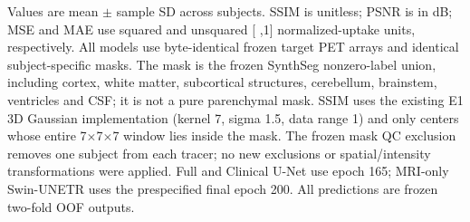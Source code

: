 \documentclass{article}
\providecommand{\DIFaddtex}[1]{{\protect\color{blue} \sf #1}} %
\providecommand{\DIFaddFL}[1]{\DIFadd{#1}} %
\providecommand{\DIFadd}[1]{\texorpdfstring{\DIFaddtex{#1}}{#1}} %
\begin{document}
\begin{table}[t]
\centering
\caption{{\color{blue}Mask-restricted quality of frozen two-fold OOF PET predictions.}}
\label{tab:r3_11_masked_summary}
\par\smallskip
\begin{minipage}{\textwidth}\footnotesize
\DIFaddFL{Values are mean $\pm$ sample SD across subjects. SSIM is unitless; PSNR is in dB; MSE and MAE use squared and unsquared }[\DIFaddFL{0,1}] \DIFaddFL{normalized-uptake units, respectively. All models use byte-identical frozen target PET arrays and identical subject-specific masks. The mask is the frozen SynthSeg nonzero-label union, including cortex, white matter, subcortical structures, cerebellum, brainstem, ventricles and CSF; it is not a pure parenchymal mask. SSIM uses the existing E1 3D Gaussian implementation (kernel 7, sigma 1.5, data range 1) and only centers whose entire 7$\times$7$\times$7 window lies inside the mask. The frozen mask QC exclusion removes one subject from each tracer; no new exclusions or spatial/intensity transformations were applied. Full and Clinical U-Net use epoch 165; MRI-only Swin-UNETR uses the prespecified final epoch 200. All predictions are frozen two-fold OOF outputs.
}\end{minipage}
\end{table}
\end{document}
